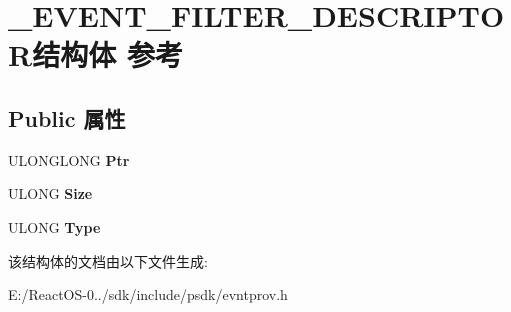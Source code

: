 \hypertarget{struct___e_v_e_n_t___f_i_l_t_e_r___d_e_s_c_r_i_p_t_o_r}{}\section{\+\_\+\+E\+V\+E\+N\+T\+\_\+\+F\+I\+L\+T\+E\+R\+\_\+\+D\+E\+S\+C\+R\+I\+P\+T\+O\+R结构体 参考}
\label{struct___e_v_e_n_t___f_i_l_t_e_r___d_e_s_c_r_i_p_t_o_r}
\subsection*{Public 属性}
\begin{DoxyCompactItemize}
\item 
\mbox{\label{struct___e_v_e_n_t___f_i_l_t_e_r___d_e_s_c_r_i_p_t_o_r_acaed372331baa33c75571c1f13f4463f}} 
U\+L\+O\+N\+G\+L\+O\+NG {\bfseries Ptr}
\item 
\mbox{\label{struct___e_v_e_n_t___f_i_l_t_e_r___d_e_s_c_r_i_p_t_o_r_aac34347a7d294cfb137c3b980b04351c}} 
U\+L\+O\+NG {\bfseries Size}
\item 
\mbox{\label{struct___e_v_e_n_t___f_i_l_t_e_r___d_e_s_c_r_i_p_t_o_r_ad095cf083b112aaad4ecfeff25012d8d}} 
U\+L\+O\+NG {\bfseries Type}
\end{DoxyCompactItemize}


该结构体的文档由以下文件生成\+:\begin{DoxyCompactItemize}
\item 
E\+:/\+React\+O\+S-\/0../sdk/include/psdk/evntprov.\+h\end{DoxyCompactItemize}
